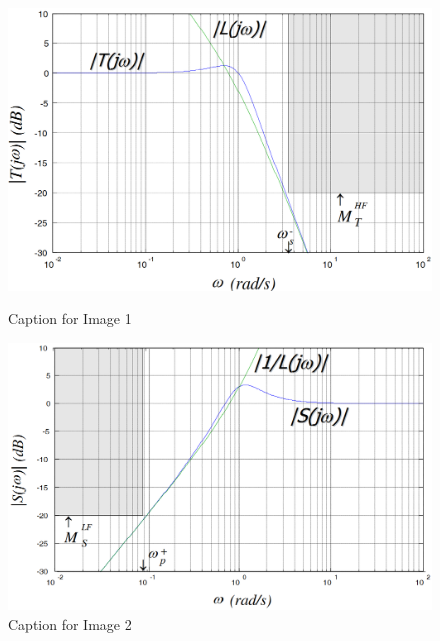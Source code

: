 \documentclass{article}
\begin{document}
	\begin{figure}[htbp]
		\centering
		\begin{minipage}{0.45\textwidth} %
			\centering
			\includegraphics[width=\linewidth]{images/constraints_ds.png} %
			\caption{Caption for Image 1}
			\label{fig:image1}
		\end{minipage}
		\hfill %
		\vrule width 0.5pt %
		\hfill %
		\begin{minipage}{0.45\textwidth} %
			\centering
			\includegraphics[width=\linewidth]{images/constraints_dp.png} %
			\caption{Caption for Image 2}
			\label{fig:image2}
		\end{minipage}
	\end{figure}
	
\end{document}
